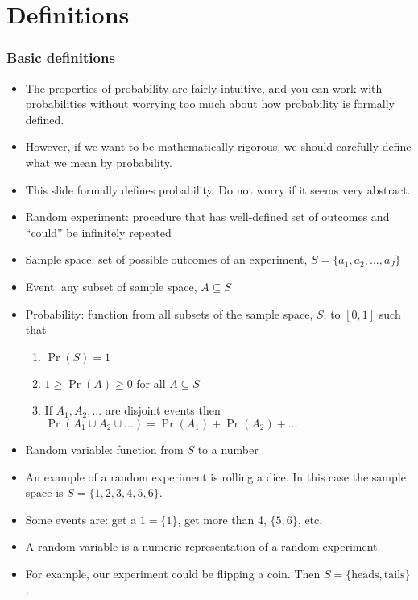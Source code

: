 \section{Definitions}

\begin{frame}[allowframebreaks]\frametitle{Basic definitions}
\begin{itemize}
\item The properties of probability are fairly intuitive, and you can
work with probabilities without worrying too much about how
probability is formally defined. 
\item However, if we want to be
mathematically rigorous, we should carefully define what we mean
by probability. 
\item This slide formally defines probability. Do not
worry if it seems very abstract.
\framebreak
\item \alert{Random experiment}: procedure that has well-defined set
    of outcomes and ``could'' be infinitely repeated
  \item \alert{Sample space}: set of possible outcomes of an
    experiment, $S = \{a_1,
    a_2, ..., a_J\}$
  \item \alert{Event}: any subset of sample space, $A \subseteq S$ 
  \item \alert{Probability}: function from all subsets of the sample
    space, $S$, to $[0,1]$
    such that
    \begin{enumerate}
    \item\label{pa1} $\Pr(S) = 1$
    \item\label{pa2} $1 \geq \Pr(A) \geq 0$ for all $A \subseteq S$
    \item\label{pa3} If $A_1, A_2,. . .$ are disjoint events then $ \Pr(A_1 \cup
      A_2 \cup ...) = \Pr (A_1) + \Pr (A_2) + . . .$
    \end{enumerate}
  \item \alert{Random variable}: function from $S$ to a number 
  
\framebreak
\item An example of a random experiment is rolling a dice. In this case the
sample space is $S=\{1,2,3,4,5,6\}$. 

\item Some events are: get a $1 =
\{1\}$, get more than 4, $\{5, 6\}$, etc.

\item A random variable is a numeric representation of a random
experiment. 

\item For example, our experiment could be flipping a coin. Then
$S = \{\mathrm{heads},\mathrm{tails}\}$. 


\end{itemize}
\end{frame}
